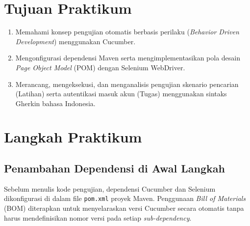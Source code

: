 \documentclass[a4paper,oneside,12pt]{report}
\newcommand{\tocboldsection}[1]{%
  \protect\renewcommand{\protect\cftchapfont}{\protect\bfseries}%
  #1%
  \protect\renewcommand{\protect\cftchapfont}{}%
}
\begin{document}
\clearpage
{}
\setcounter{page}{1}
\thispagestyle{empty}

\clearpage
\setcounter{page}{2}
\tableofcontents
\clearpage

\setcounter{page}{1}

\chapter[Tujuan Praktikum]{Tujuan Praktikum}
\begin{enumerate}
    \item Memahami konsep pengujian otomatis berbasis perilaku (\textit{Behavior Driven Development}) menggunakan Cucumber.
    \item Mengonfigurasi dependensi Maven serta mengimplementasikan pola desain \textit{Page Object Model} (POM) dengan Selenium WebDriver.
    \item Merancang, mengeksekusi, dan menganalisis pengujian skenario pencarian (Latihan) serta autentikasi masuk akun (Tugas) menggunakan sintaks Gherkin bahasa Indonesia.
\end{enumerate}
\clearpage

\chapter[\texorpdfstring{\tocboldsection{Langkah Praktikum}}{Langkah Praktikum}]{Langkah Praktikum}

\section{Penambahan Dependensi di Awal Langkah}
Sebelum menulis kode pengujian, dependensi Cucumber dan Selenium dikonfigurasi di dalam file \texttt{pom.xml} proyek Maven. Penggunaan \textit{Bill of Materials} (BOM) diterapkan untuk menyelaraskan versi Cucumber secara otomatis tanpa harus mendefinisikan nomor versi pada setiap \textit{sub-dependency}.
\end{document}
